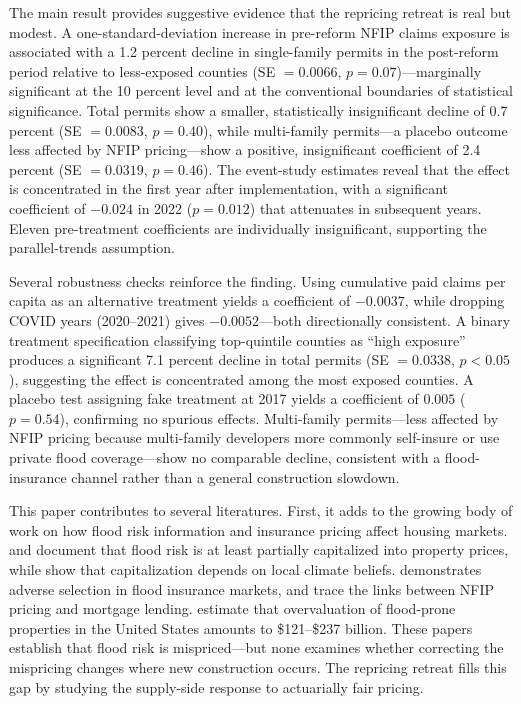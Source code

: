 \documentclass[12pt]{article}
\begin{document}
The main result provides suggestive evidence that the repricing retreat is real but modest. A one-standard-deviation increase in pre-reform NFIP claims exposure is associated with a 1.2 percent decline in single-family permits in the post-reform period relative to less-exposed counties (SE $= 0.0066$, $p = 0.07$)---marginally significant at the 10 percent level and at the conventional boundaries of statistical significance. Total permits show a smaller, statistically insignificant decline of 0.7 percent (SE $= 0.0083$, $p = 0.40$), while multi-family permits---a placebo outcome less affected by NFIP pricing---show a positive, insignificant coefficient of 2.4 percent (SE $= 0.0319$, $p = 0.46$). The event-study estimates reveal that the effect is concentrated in the first year after implementation, with a significant coefficient of $-0.024$ in 2022 ($p = 0.012$) that attenuates in subsequent years. Eleven pre-treatment coefficients are individually insignificant, supporting the parallel-trends assumption.

Several robustness checks reinforce the finding. Using cumulative paid claims per capita as an alternative treatment yields a coefficient of $-0.0037$, while dropping COVID years (2020--2021) gives $-0.0052$---both directionally consistent. A binary treatment specification classifying top-quintile counties as ``high exposure'' produces a significant 7.1 percent decline in total permits (SE $= 0.0338$, $p < 0.05$), suggesting the effect is concentrated among the most exposed counties. A placebo test assigning fake treatment at 2017 yields a coefficient of $0.005$ ($p = 0.54$), confirming no spurious effects. Multi-family permits---less affected by NFIP pricing because multi-family developers more commonly self-insure or use private flood coverage---show no comparable decline, consistent with a flood-insurance channel rather than a general construction slowdown.

This paper contributes to several literatures. First, it adds to the growing body of work on how flood risk information and insurance pricing affect housing markets. \citet{bin2008} and \citet{bernstein2019} document that flood risk is at least partially capitalized into property prices, while \citet{baldauf2020} show that capitalization depends on local climate beliefs. \citet{wagner2022} demonstrates adverse selection in flood insurance markets, and \citet{keys2024} trace the links between NFIP pricing and mortgage lending. \citet{gourevitch2023} estimate that overvaluation of flood-prone properties in the United States amounts to \$121--\$237 billion. These papers establish that flood risk is mispriced---but none examines whether correcting the mispricing changes where new construction occurs. The repricing retreat fills this gap by studying the supply-side response to actuarially fair pricing.
\end{document}
